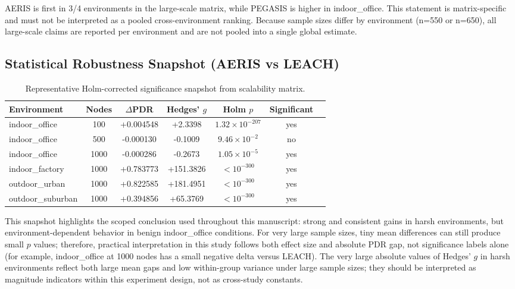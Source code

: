 ﻿\documentclass[sensors,article,submit,moreauthors,pdftex]{Definitions/mdpi}
\begin{document}
AERIS is first in 3/4 environments in the large-scale matrix, while PEGASIS is higher in indoor\_office. This statement is matrix-specific and must not be interpreted as a pooled cross-environment ranking.
Because sample sizes differ by environment (n=550 or n=650), all large-scale claims are reported per environment and are not pooled into a single global estimate.

\subsection{Statistical Robustness Snapshot (AERIS vs LEACH)}
\begin{table}[H]
\caption{Representative Holm-corrected significance snapshot from scalability matrix.}
\label{tab:robust_snapshot}
\centering
\begin{tabular}{lcccccc}
\toprule
Environment & Nodes & $\Delta$PDR & Hedges' $g$ & Holm $p$ & Significant \\
\midrule
indoor\_office    & 100  & +0.004548 & +2.3398 & $1.32\times10^{-207}$ & yes \\
indoor\_office    & 500  & -0.000130 & -0.1009 & $9.46\times10^{-2}$ & no \\
indoor\_office    & 1000 & -0.000286 & -0.2673 & $1.05\times10^{-5}$ & yes \\
indoor\_factory   & 1000 & +0.783773 & +151.3826 & $<10^{-300}$ & yes \\
outdoor\_urban    & 1000 & +0.822585 & +181.4951 & $<10^{-300}$ & yes \\
outdoor\_suburban & 1000 & +0.394856 & +65.3769 & $<10^{-300}$ & yes \\
\bottomrule
\end{tabular}
\end{table}

This snapshot highlights the scoped conclusion used throughout this manuscript: strong and consistent gains in harsh environments, but environment-dependent behavior in benign indoor\_office conditions.
For very large sample sizes, tiny mean differences can still produce small $p$ values; therefore, practical interpretation in this study follows both effect size and absolute PDR gap, not significance labels alone (for example, indoor\_office at 1000 nodes has a small negative delta versus LEACH).
The very large absolute values of Hedges' $g$ in harsh environments reflect both large mean gaps and low within-group variance under large sample sizes; they should be interpreted as magnitude indicators within this experiment design, not as cross-study constants.
\end{document}
